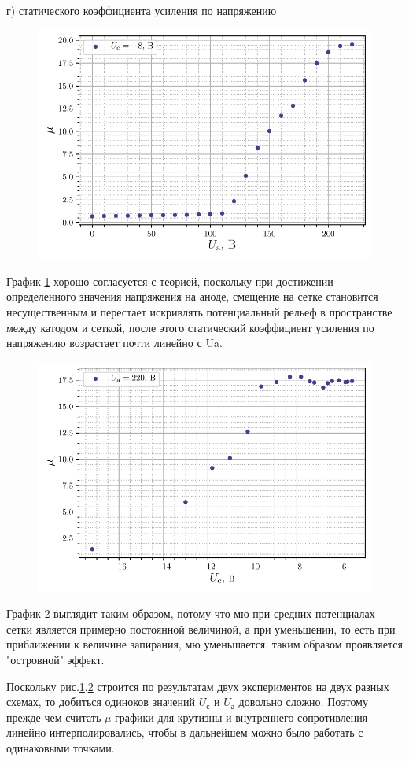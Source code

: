 \newpage
г) статического коэффициента усиления по напряжению
\begin{figure}[h!]
	\centering
    \includegraphics[width=0.65\linewidth]{scripts/fig7}
	\caption{}
	\label{fig:7}
\end{figure}

График \ref{fig:7} хорошо согласуется с теорией, поскольку при достижении определенного значения напряжения на аноде, смещение на сетке становится несущественным и перестает искривлять потенциальный рельеф в пространстве между катодом и сеткой, после этого статический коэффициент усиления по напряжению возрастает почти линейно с Ua.

\begin{figure}[H]
	\centering
    \includegraphics[width=0.7\linewidth]{scripts/fig8}
	\caption{}
	\label{fig:8}
\end{figure}

График \ref{fig:8} выглядит таким образом, потому что мю при средних потенциалах сетки является примерно постоянной величиной, а при уменьшении, то есть при приближении к величине запирания, мю уменьшается, таким образом проявляется "островной" эффект.

Поскольку рис.\ref{fig:7},\ref{fig:8}  строится по результатам двух
экспериментов на двух разных схемах, то добиться одиноков значений
$U_{\text{с}}$ и $U_{\text{а}}$ довольно сложно. Поэтому прежде чем считать
$\mu$ графики для крутизны и внутреннего сопротивления линейно
интерполировались, чтобы в дальнейшем можно было работать с одинаковыми
точками.


